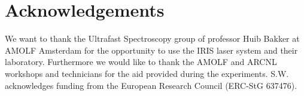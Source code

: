 \documentclass[aip, jap, reprint, amsmath, amssymb]{revtex4-1}
\begin{document}
\section*{Acknowledgements}
We want to thank the Ultrafast Spectroscopy group of professor Huib Bakker at AMOLF Amsterdam for the opportunity to use the IRIS laser system and their laboratory. Furthermore we would like to thank the AMOLF and ARCNL workshops and technicians for the aid provided during the experiments. S.W. acknowledges funding from the European Research Council (ERC-StG 637476).
\end{document}
